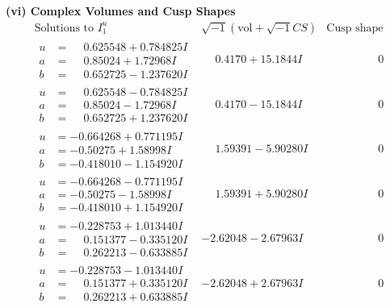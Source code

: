 \documentclass[1p]{elsarticle_modified}
\theoremstyle{definition}
\newcommand{\I}{\sqrt{-1}}
\begin{document}
\newpage\flushleft \textbf{(vi) Complex Volumes and Cusp Shapes}
$$\begin{array}{c|c|c}  
\text{Solutions to }I^u_{1}& \I (\text{vol} + \sqrt{-1}CS) & \text{Cusp shape}\\
 \hline 
\begin{aligned}
u &= \phantom{-}0.625548 + 0.784825 I \\
a &= \phantom{-}0.85024 + 1.72968 I \\
b &= \phantom{-}0.652725 - 1.237620 I\end{aligned}
 & \phantom{-}0.4170 + 15.1844 I & \phantom{-0.000000 } 0 \\ \hline\begin{aligned}
u &= \phantom{-}0.625548 - 0.784825 I \\
a &= \phantom{-}0.85024 - 1.72968 I \\
b &= \phantom{-}0.652725 + 1.237620 I\end{aligned}
 & \phantom{-}0.4170 - 15.1844 I & \phantom{-0.000000 } 0 \\ \hline\begin{aligned}
u &= -0.664268 + 0.771195 I \\
a &= -0.50275 + 1.58998 I \\
b &= -0.418010 - 1.154920 I\end{aligned}
 & \phantom{-}1.59391 - 5.90280 I & \phantom{-0.000000 } 0 \\ \hline\begin{aligned}
u &= -0.664268 - 0.771195 I \\
a &= -0.50275 - 1.58998 I \\
b &= -0.418010 + 1.154920 I\end{aligned}
 & \phantom{-}1.59391 + 5.90280 I & \phantom{-0.000000 } 0 \\ \hline\begin{aligned}
u &= -0.228753 + 1.013440 I \\
a &= \phantom{-}0.151377 - 0.335120 I \\
b &= \phantom{-}0.262213 - 0.633885 I\end{aligned}
 & -2.62048 - 2.67963 I & \phantom{-0.000000 } 0 \\ \hline\begin{aligned}
u &= -0.228753 - 1.013440 I \\
a &= \phantom{-}0.151377 + 0.335120 I \\
b &= \phantom{-}0.262213 + 0.633885 I\end{aligned}
 & -2.62048 + 2.67963 I & \phantom{-0.000000 } 0 \\ \hline\begin{aligned}

\end{aligned}
\end{array}$$
\end{document}
